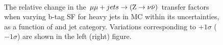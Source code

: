 \begin{figure}[!h]
  \centering
   ~~
  \\

  \caption{\label{fig:tfSyst_bsf_mumuToZinv} The relative change in
  the $\mmj \rightarrow (\znunu)$ transfer
  factors when varying b-tag SF for heavy jets in MC within its uncertainties, as a function of \scalht and jet category. 
  Variations corresponding to $+1\sigma$ ($-1\sigma$) are shown in the left (right) figure. 
  }
\end{figure}

